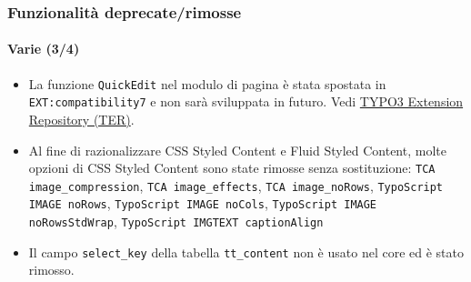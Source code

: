 \begin{frame}[fragile]
	\frametitle{Funzionalità deprecate/rimosse}
	\framesubtitle{Varie (3/4)}

	\begin{itemize}
		\item La funzione \texttt{QuickEdit} nel modulo di pagina è stata spostata in
			\texttt{EXT:compatibility7} e non sarà sviluppata in futuro.\newline
			Vedi \href{https://typo3.org/extensions/repository}{TYPO3 Extension Repository (TER)}.

		\item Al fine di razionalizzare CSS Styled Content e Fluid Styled Content, molte opzioni
			di CSS Styled Content sono state rimosse senza sostituzione:
			\texttt{TCA image\_compression}, \texttt{TCA image\_effects}, \texttt{TCA image\_noRows},
			\texttt{TypoScript IMAGE noRows}, \texttt{TypoScript IMAGE noCols},
			\texttt{TypoScript IMAGE noRowsStdWrap}, \texttt{TypoScript IMGTEXT captionAlign}

		\item Il campo \texttt{select\_key} della tabella \texttt{tt\_content} non è usato nel core
			ed è stato rimosso.

	\end{itemize}

\end{frame}



